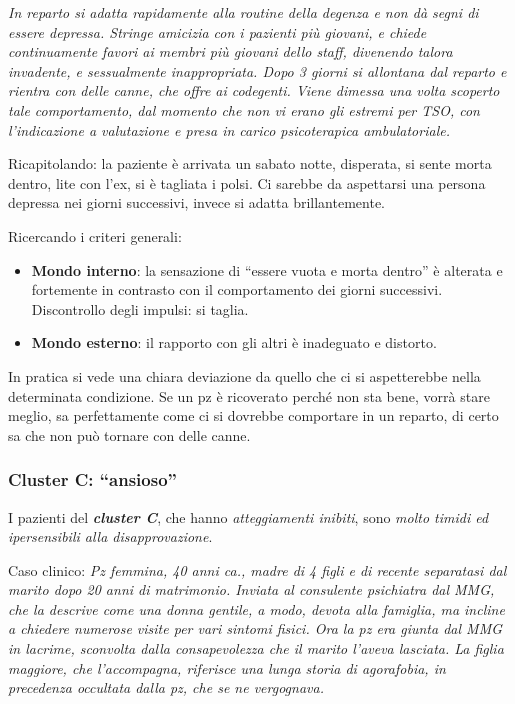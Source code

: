 \emph{In reparto si adatta rapidamente alla routine della degenza e non
dà segni di essere depressa. Stringe amicizia con i pazienti più
giovani, e chiede continuamente favori ai membri più giovani dello
staff, divenendo talora invadente, e sessualmente inappropriata. Dopo 3
giorni si allontana dal reparto e rientra con delle canne, che offre ai
codegenti. Viene dimessa una volta scoperto tale comportamento, dal
momento che non vi erano gli estremi per TSO, con l'indicazione a
valutazione e presa in carico psicoterapica ambulatoriale.}

Ricapitolando: la paziente è arrivata un sabato notte, disperata, si
sente morta dentro, lite con l'ex, si è tagliata i polsi. Ci sarebbe da
aspettarsi una persona depressa nei giorni successivi, invece si adatta
brillantemente.

Ricercando i criteri generali:

\begin{itemize}
\item
  \textbf{Mondo interno}: la sensazione di ``essere vuota e morta
  dentro'' è alterata e fortemente in contrasto con il comportamento dei
  giorni successivi. Discontrollo degli impulsi: si taglia.
\item
  \textbf{Mondo esterno}: il rapporto con gli altri è inadeguato e
  distorto.
\end{itemize}

In pratica si vede una chiara deviazione da quello che ci si
aspetterebbe nella determinata condizione. Se un pz è ricoverato perché
non sta bene, vorrà stare meglio, sa perfettamente come ci si dovrebbe
comportare in un reparto, di certo sa che non può tornare con delle
canne.

\subsubsection{Cluster C: ``ansioso''}

I pazienti del \textbf{\emph{cluster C}}, che hanno \emph{atteggiamenti
inibiti}, sono \emph{molto timidi ed ipersensibili alla
disapprovazione}.

Caso clinico: \emph{Pz femmina, 40 anni ca., madre di 4 figli e di
recente separatasi dal marito dopo 20 anni di matrimonio. Inviata al
consulente psichiatra dal MMG, che la descrive come una donna gentile, a
modo, devota alla famiglia, ma incline a chiedere numerose visite per
vari sintomi fisici. Ora la pz era giunta dal MMG in lacrime, sconvolta
dalla consapevolezza che il marito l'aveva lasciata. La figlia maggiore,
che l'accompagna, riferisce una lunga storia di agorafobia, in
precedenza occultata dalla pz, che se ne vergognava.}

